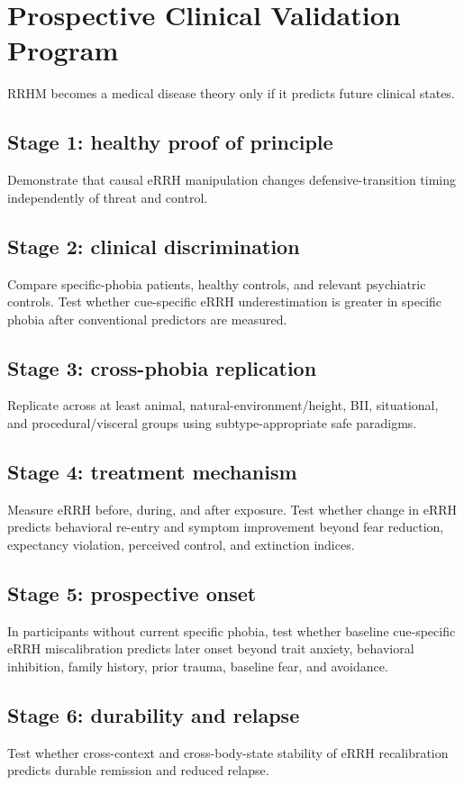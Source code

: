 \documentclass[11pt]{article}
\begin{document}
\section{Prospective Clinical Validation Program}
RRHM becomes a medical disease theory only if it predicts future clinical states.

\subsection{Stage 1: healthy proof of principle}
Demonstrate that causal eRRH manipulation changes defensive-transition timing independently of threat and control.

\subsection{Stage 2: clinical discrimination}
Compare specific-phobia patients, healthy controls, and relevant psychiatric controls. Test whether cue-specific eRRH underestimation is greater in specific phobia after conventional predictors are measured.

\subsection{Stage 3: cross-phobia replication}
Replicate across at least animal, natural-environment/height, BII, situational, and procedural/visceral groups using subtype-appropriate safe paradigms.

\subsection{Stage 4: treatment mechanism}
Measure eRRH before, during, and after exposure. Test whether change in eRRH predicts behavioral re-entry and symptom improvement beyond fear reduction, expectancy violation, perceived control, and extinction indices.

\subsection{Stage 5: prospective onset}
In participants without current specific phobia, test whether baseline cue-specific eRRH miscalibration predicts later onset beyond trait anxiety, behavioral inhibition, family history, prior trauma, baseline fear, and avoidance.

\subsection{Stage 6: durability and relapse}
Test whether cross-context and cross-body-state stability of eRRH recalibration predicts durable remission and reduced relapse.
\end{document}
